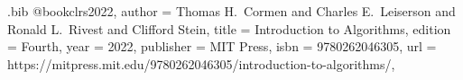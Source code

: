 



\begin{filecontents}[overwrite]{\jobname.bib}
@book{clrs2022,
  author    = {Thomas H.~Cormen and Charles E.~Leiserson and Ronald L.~Rivest and Clifford Stein},
  title     = {Introduction to Algorithms},
  edition   = {Fourth},
  year      = {2022},
  publisher = {MIT Press},
  isbn      = {9780262046305},
  url       = {https://mitpress.mit.edu/9780262046305/introduction-to-algorithms/},
}
\end{filecontents}

\documentclass[twocolumn, a3paper, fontsize=9pt, headings=standardclasses, parskip=half]{scrartcl}

\usepackage{csquotes}



\usepackage[automark]{scrlayer-scrpage}
\clearpairofpagestyles
\ofoot{\pagemark} %


\usepackage{graphicx}
\usepackage[dvipsnames, table]{xcolor}

\usepackage[left=25mm, right=25mm, top=25mm, bottom=35mm]{geometry} %


\usepackage{float}
\usepackage{placeins} 
\usepackage{etoolbox}



\preto\section{\FloatBarrier}
\preto\subsection{\FloatBarrier}
\preto\subsubsection{\FloatBarrier} 

